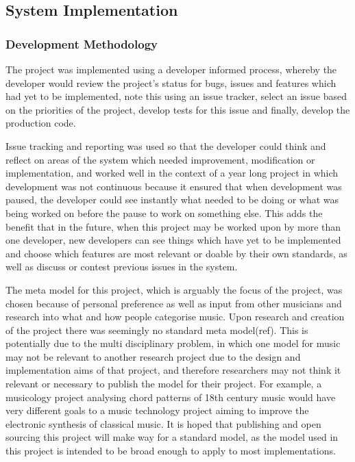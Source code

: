 \subsection{System Implementation}
\subsubsection{Development Methodology}
The project was implemented using a developer informed process, whereby the developer would review the project's status for bugs, issues and features which had yet to be implemented, note this using an issue tracker, select an issue based on the priorities of the project, develop tests for this issue and finally, develop the production code. 


Issue tracking and reporting was used so that the developer could think and reflect on areas of the system which needed improvement, modification or implementation, and worked well in the context of a year long project in which development was not continuous because it ensured that when development was paused, the developer could see instantly what needed to be doing or what was being worked on before the pause to work on something else. This adds the benefit that in the future, when this project may be worked upon by more than one developer, new developers can see things which have yet to be implemented and choose which features are most relevant or doable by their own standards, as well as discuss or contest previous issues in the system.


The meta model for this project, which is arguably the focus of the project, was chosen because of personal preference as well as input from other musicians and research into what and how people categorise music. Upon research and creation of the project there was seemingly no standard meta model(ref). This is potentially due to the multi disciplinary problem, in which one model for music may not be relevant to another research project due to the design and implementation aims of that project, and therefore researchers may not think it relevant or necessary to publish the model for their project\parencite{MIR}. For example, a musicology project analysing chord patterns of 18th century music would have very different goals to a music technology project aiming to improve the electronic synthesis of classical music. It is hoped that publishing and open sourcing this project will make way for a standard model, as the model used in this project is intended to be broad enough to apply to most implementations. 

